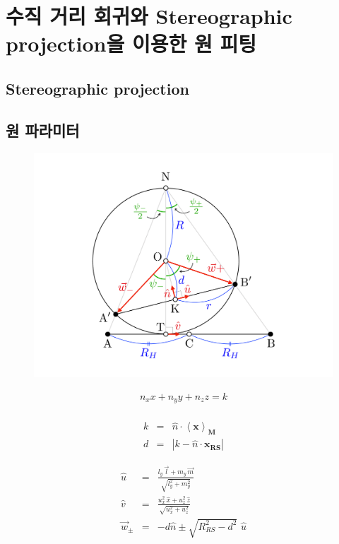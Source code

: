 \documentclass[chapter,a4paper,10pt]{oblivoir}
\begin{document}
\chapter{수직 거리 회귀와 Stereographic projection을 이용한 원 피팅}
\section{Stereographic projection}
\section{원 파라미터}

\begin{figure}[ht]
\centering\includegraphics[width=0.8\linewidth]{stereographic_projection.pdf}
\label{sp}
\end{figure}

\begin{eqnarray}
n_xx+n_yy+n_zz = k\\
\end{eqnarray}

\begin{eqnarray}
k &=& \hat{n}\cdot\mathbf{\left<x\right>_M}\\
d &=& \left|k - \hat{n}\cdot \mathbf{x_{RS}}\right|
\end{eqnarray}

\begin{eqnarray}
\hat{u} &=& \frac{l_y\,\vec{l}+m_y\,\vec{m}}{\sqrt{l_y^2+m_y^2}}\\
\hat{v} &=& \frac{u_x^2\,\hat{x} + u_z^2\,\hat{z}}{\sqrt{u_x^2+u_z^2}}\\
\vec{w}_\pm &=& - d\hat{n} \pm \sqrt{R_{RS}^2-d^2}\,\,\hat{u}
\end{eqnarray}
\end{document}
